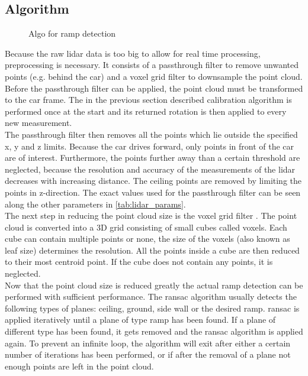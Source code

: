\subsection{Algorithm}
\begin{figure}[htb]
    \centering
    
    \caption{Algo for ramp detection}
    \label{fig:flowchart_lidar}
\end{figure}
Because the raw \gls{lidar} data is too big to allow for real time processing, preprocessing is necessary.
It consists of a passthrough filter to remove unwanted points (e.g. behind the car) and a voxel grid filter to downsample the point cloud.
Before the passthrough filter can be applied, the point cloud must be transformed to the car frame.
The in the previous section described calibration algorithm is performed once at the start and its returned rotation is then applied to every new measurement.\\
The passthrough filter then removes all the points which lie outside the specified x, y and z limits.
Because the car drives forward, only points in front of the car are of interest.
Furthermore, the points further away than a certain threshold are neglected, because the resolution and accuracy of the measurements of the \gls{lidar} decreases with increasing distance.
The ceiling points are removed by limiting the points in z-direction.
The exact values used for the passthrough filter can be seen along the other parameters in \cref{tab:lidar_params}.\\
The next step in reducing the point cloud size is the voxel grid filter \cite{Vosselman2004}.
The point cloud is converted into a 3D grid consisting of small cubes called voxels.
Each cube can contain multiple points or none, the size of the voxels (also known as leaf size) determines the resolution.
All the points inside a cube are then reduced to their most centroid point.
If the cube does not contain any points, it is neglected.\\
Now that the point cloud size is reduced greatly the actual ramp detection can be performed with sufficient performance.
The \gls{ransac} algorithm usually detects the following types of planes: ceiling, ground, side wall or the desired ramp.
\gls{ransac} is applied iteratively until a plane of type ramp has been found.
If a plane of different type has been found, it gets removed and the \gls{ransac} algorithm is applied again.
To prevent an infinite loop, the algorithm will exit after either a certain number of iterations has been performed, or if after the removal of a plane not enough points are left in the point cloud.\\
